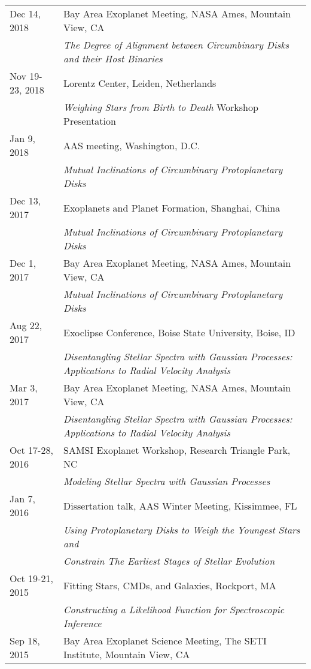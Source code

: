 \begin{longtable}{@{\hspace{10pt}}p{1.2in}l}
  Dec 14, 2018 & Bay Area Exoplanet Meeting, NASA Ames, Mountain View, CA\\
  & \emph{The Degree of Alignment between Circumbinary Disks and their Host Binaries} \\[\rowskip]
  Nov 19-23, 2018 & Lorentz Center, Leiden, Netherlands\\
  & \emph{Weighing Stars from Birth to Death} Workshop Presentation \\[\rowskip]
  Jan 9, 2018 & AAS meeting, Washington, D.C. \\
  & \emph{Mutual Inclinations of Circumbinary Protoplanetary Disks} \\[\rowskip]
  Dec 13, 2017 & Exoplanets and Planet Formation, Shanghai, China \\
  & \emph{Mutual Inclinations of Circumbinary Protoplanetary Disks} \\[\rowskip]
  Dec 1, 2017 & Bay Area Exoplanet Meeting, NASA Ames, Mountain View, CA\\
  & \emph{Mutual Inclinations of Circumbinary Protoplanetary Disks} \\[\rowskip]
  Aug 22, 2017 & Exoclipse Conference, Boise State University, Boise, ID\\
  & \emph{Disentangling Stellar Spectra with Gaussian Processes: Applications to Radial Velocity Analysis} \\[\rowskip]
  Mar 3, 2017 & Bay Area Exoplanet Meeting, NASA Ames, Mountain View, CA\\
  & \emph{Disentangling Stellar Spectra with Gaussian Processes: Applications to Radial Velocity Analysis} \\[\rowskip]
  Oct 17-28, 2016 & SAMSI Exoplanet Workshop, Research Triangle Park, NC\\
  & \emph{Modeling Stellar Spectra with Gaussian Processes} \\[\rowskip]
  Jan 7, 2016 & Dissertation talk, AAS Winter Meeting, Kissimmee, FL \\
  & \emph{Using Protoplanetary Disks to Weigh the Youngest Stars and} \\
  & \emph{Constrain The Earliest Stages of Stellar Evolution} \\[\rowskip]
  Oct 19-21, 2015 & Fitting Stars, CMDs, and Galaxies, Rockport, MA \\
  & \emph{Constructing a Likelihood Function for Spectroscopic Inference}\\[\rowskip]
  Sep 18, 2015 & Bay Area Exoplanet Science Meeting, The SETI Institute, Mountain View, CA \\

\end{longtable}
